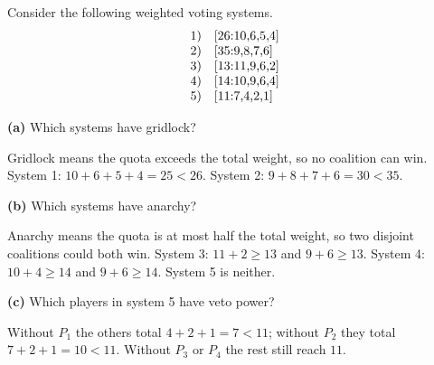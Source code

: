\documentclass[12pt]{ximera}
\begin{document}
\begin{problem}
Consider the following weighted voting systems.
\[
\begin{array}{ll}
1) & $[26:10,6,5,4]$\\
2) & $[35:9,8,7,6]$\\
3) & $[13:11,9,6,2]$\\
4) & $[14:10,9,6,4]$\\
5) & $[11:7,4,2,1]$\\
\end{array}
\]

\begin{prompt}
\textbf{(a)} Which systems have gridlock?
\begin{selectAll}
\end{selectAll}
\begin{feedback}
Gridlock means the quota exceeds the total weight, so no coalition can win.
System 1: $10+6+5+4=25<26$. System 2: $9+8+7+6=30<35$.
\end{feedback}
\end{prompt}

\begin{prompt}
\textbf{(b)} Which systems have anarchy?
\begin{selectAll}
\end{selectAll}
\begin{feedback}
Anarchy means the quota is at most half the total weight, so two disjoint coalitions
could both win. System 3: $11+2\ge13$ and $9+6\ge13$. System 4: $10+4\ge14$ and $9+6\ge14$. System 5 is neither.
\end{feedback}
\end{prompt}

\begin{prompt}
\textbf{(c)} Which players in system 5 have veto power?
\begin{selectAll}
\end{selectAll}
\begin{feedback}
Without $P_1$ the others total $4+2+1=7<11$; without $P_2$ they total $7+2+1=10<11$. Without $P_3$ or $P_4$ the rest still reach $11$.
\end{feedback}
\end{prompt}
\end{problem}
\end{document}
